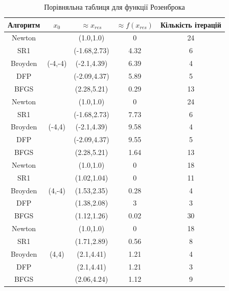 \vspace{-0.21cm}
\begin{table}[h!]
    \centering
    \begin{tabular}{|c|c|c|c|c|}
        \hline
        \textbf{Алгоритм} & $x_{0}$ & $\approx x_{res}$ & $\approx f(x_{res})$ & \textbf{Кількість ітерацій}  \\
        \hline
        Newton & \multirow{5}{*}{(-4,-4)} & (1.0,1.0) & 0 & 24 \\
        \cline{1-1} \cline{3-5}
        SR1 & & (-1.68,2.73) & 4.32 & 6 \\
        \cline{1-1} \cline{3-5}
        Broyden & & (-2.1,4.39) & 6.39 & 4 \\
        \cline{1-1} \cline{3-5}
        DFP & & (-2.09,4.37) & 5.89 & 5 \\
        \cline{1-1} \cline{3-5}
        BFGS & & (2.28,5.21) & 0.29 & 13 \\
        \hline
        Newton & \multirow{5}{*}{(-4,4)} & (1.0,1.0) & 0 & 24 \\
        \cline{1-1} \cline{3-5}
        SR1 & & (-1.68,2.73) & 7.73 & 6 \\
        \cline{1-1} \cline{3-5}
        Broyden & & (-2.1,4.39) & 9.58 & 4 \\
        \cline{1-1} \cline{3-5}
        DFP & & (-2.09,4.37) & 9.55 & 5 \\
        \cline{1-1} \cline{3-5}
        BFGS & & (2.28,5.21) & 1.64 & 13 \\
        \hline
        Newton & \multirow{5}{*}{(4,-4)} & (1.0,1.0) & 0 & 18 \\
        \cline{1-1} \cline{3-5}
        SR1 & & (1.02,1.04) & 0 & 11 \\
        \cline{1-1} \cline{3-5}
        Broyden & & (1.53,2.35) & 0.28 & 4 \\
        \cline{1-1} \cline{3-5}
        DFP & & (1.38,2.08) & 3 & 3 \\
        \cline{1-1} \cline{3-5}
        BFGS & & (1.12,1.26) & 0.02 & 30 \\
        \hline
        Newton & \multirow{5}{*}{(4,4)} & (1.0,1.0) & 0 & 18 \\
        \cline{1-1} \cline{3-5}
        SR1 & & (1.71,2.89) & 0.56 & 8 \\
        \cline{1-1} \cline{3-5}
        Broyden & & (2.1,4.41) & 1.21 & 4 \\
        \cline{1-1} \cline{3-5}
        DFP & & (2.1,4.41) & 1.21 & 3 \\
        \cline{1-1} \cline{3-5}
        BFGS & & (2.06,4.24) & 1.12 & 9 \\
        \hline
    \end{tabular}
    \caption{Порівняльна таблиця для функції Розенброка}
\end{table}

